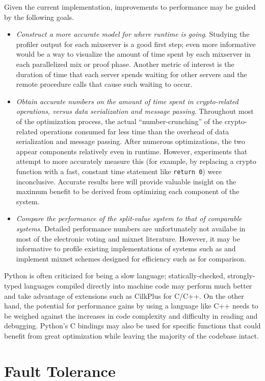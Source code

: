 Given the current implementation, improvements to performance may be guided by the following goals.
\begin{itemize}
\item \emph{Construct a more accurate model for where runtime is going}. Studying the profiler output for each mixserver is a good first step; even more informative would be a way to visualize the amount of time spent by each mixserver in each parallelized mix or proof phase. Another metric of interest is the duration of time that each server spends waiting for other servers and the remote procedure calls that cause such waiting to occur.
\item \emph{Obtain accurate numbers on the amount of time spent in crypto-related operations, versus data serialization and message passing}. Throughout most of the optimization process, the actual ``number-crunching'' of the crypto-related operations consumed far less time than the overhead of data serialization and message passing. After numerous optimizations, the two appear components relatively even in runtime. However, experiments that attempt to more accurately measure this (for example, by replacing a crypto function with a fast, constant time statement like \texttt{return 0}) were inconclusive. Accurate results here will provide valuable insight on the maximum benefit to be derived from optimizing each component of the system.
\item \emph{Compare the performance of the split-value system to that of comparable systems}. Detailed performance numbers are unfortunately not availabe in most of the electronic voting and mixnet literature. However, it may be informative to profile existing implementations of systems such as \cite{votebox, adida-helios} and implement mixnet schemes designed for efficiency such as \cite{chase13} for comparison.
\end{itemize}

Python is often criticized for being a slow language; statically-checked, strongly-typed languages compiled directly into machine code may perform much better and take advantage of extensions such as CilkPlus for C/C++. On the other hand, the potential for performance gains by using a language like C++ needs to be weighed against the increases in code complexity and difficulty in reading and debugging. Python's C bindings may also be used for specific functions that could benefit from great optimization while leaving the majority of the codebase intact.

\section{Fault Tolerance}

